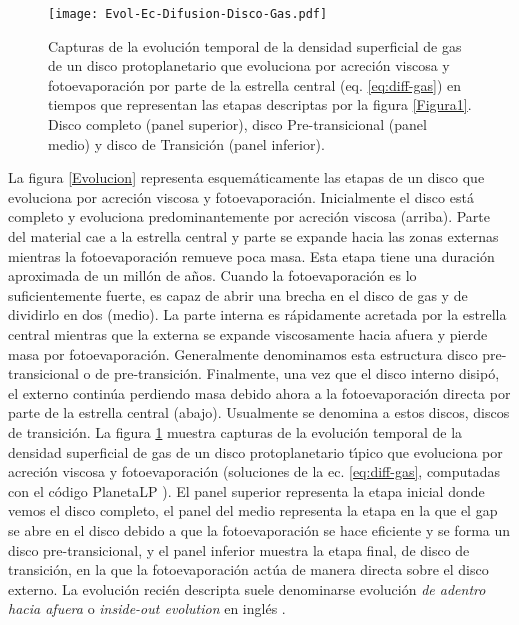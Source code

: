 \documentclass[baaa]{baaa}
\begin{document}
\begin{figure}[!t]
\centering
\texttt{[image: Evol-Ec-Difusion-Disco-Gas.pdf]}
\caption{Capturas de la evoluci\'on temporal de la densidad superficial de gas de un disco protoplanetario que evoluciona por acreci\'on viscosa y fotoevaporaci\'on por parte de la estrella central (eq. \ref{eq:diff-gas}) en tiempos que representan las etapas descriptas por la figura \ref{Figura1}. Disco completo (panel superior), disco Pre-transicional (panel medio) y disco de Transici\'on (panel inferior).}
\label{Perfiles}
\end{figure}

La figura \ref{Evolucion} representa esquem\'aticamente las etapas de un disco que evoluciona por acreci\'on viscosa y fotoevaporaci\'on. Inicialmente el disco est\'a completo y evoluciona predominantemente por acreci\'on viscosa (arriba). Parte del material cae a la estrella central y parte se expande hacia las zonas externas mientras la fotoevaporaci\'on remueve poca masa. Esta etapa tiene una duraci\'on aproximada de un mill\'on de a\~nos. Cuando la fotoevaporaci\'on es lo suficientemente fuerte, es capaz de abrir una brecha en el disco de gas y de dividirlo en dos (medio). La parte interna es r\'apidamente acretada por la estrella central mientras que la externa se expande viscosamente hacia afuera y pierde masa por fotoevaporaci\'on. Generalmente denominamos esta estructura disco pre-transicional o de pre-transici\'on. Finalmente, una vez que el disco interno disipó, el externo contin\'ua perdiendo masa debido ahora a la fotoevaporaci\'on directa por parte de la estrella central (abajo). Usualmente se denomina a estos discos, discos de transici\'on. La figura \ref{Perfiles} muestra capturas  de la evoluci\'on temporal de la densidad superficial de gas de un disco protoplanetario t\'{\i}pico que evoluciona por acreci\'on viscosa y fotoevaporaci\'on (soluciones de la ec. \ref{eq:diff-gas}, computadas con el c\'odigo PlanetaLP \citep{Ronco2017,Guilera2020}). El panel superior representa la etapa inicial donde vemos el disco completo, el panel del medio representa la etapa en la que el gap se abre en el disco debido a que la fotoevaporaci\'on se hace eficiente y se forma un disco pre-transicional, y el panel inferior muestra la etapa final, de disco de transici\'on, en la que la fotoevaporaci\'on act\'ua de manera directa sobre el disco externo. La evoluci\'on reci\'en descripta suele denominarse evoluci\'on \textit{de adentro hacia afuera} o \textit{inside-out evolution} en ingl\'es \citep{Gorti2009,Owen2010,Kunitomo2021}.
\end{document}
